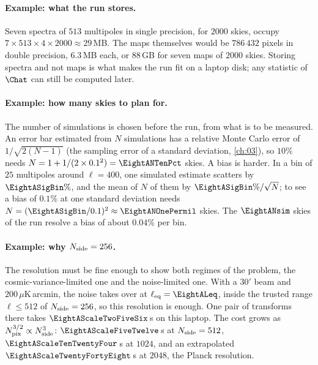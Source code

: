 \paragraph{Example: what the run stores.}
Seven spectra of $513$ multipoles in single precision, for $2000$ skies, occupy
$7\times513\times4\times2000\approx29$\,MB. The maps themselves would be $786\,432$ pixels in
double precision, $6.3$\,MB each, or $88$\,GB for seven maps of $2000$ skies. Storing spectra and
not maps is what makes the run fit on a laptop disk; any statistic of $\Chat$ can still be
computed later.

\paragraph{Example: how many skies to plan for.}
The number of simulations is chosen before the run, from what is to be measured. An error bar
estimated from $N$ simulations has a relative Monte Carlo error of $1/\sqrt{2(N-1)}$ (the
sampling error of a standard deviation, \cref{ch:03}), so $10\%$ needs
$N=1+1/(2\times0.1^2)=\EightANTenPct$ skies. A bias is harder. In a bin of $25$ multipoles
around $\ell=400$, one simulated estimate scatters by $\EightASigBin\%$, and the mean of $N$ of
them by $\EightASigBin\%/\sqrt N$; to see a bias of $0.1\%$ at one standard deviation needs
$N=(\EightASigBin/0.1)^2\approx\EightANOnePermil$ skies. The $\EightANsim$ skies of the run
resolve a bias of about $0.04\%$ per bin.

\paragraph{Example: why $N_{\rm side}=256$.}
The resolution must be fine enough to show both regimes of the problem, the
cosmic-variance-limited one and the noise-limited one. With a $30'$ beam and
$200\,\mu$K\,arcmin, the noise takes over at $\ell_{\rm eq}=\EightALeq$, inside the trusted
range $\ell\le512$ of $N_{\rm side}=256$, so this resolution is enough. One pair of
transforms there takes $\EightAScaleTwoFiveSix$\,s on this laptop. The cost grows as
$N_{\rm pix}^{3/2}\propto N_{\rm side}^3$: $\EightAScaleFiveTwelve$\,s at $N_{\rm side}=512$,
$\EightAScaleTenTwentyFour$\,s at $1024$, and an extrapolated $\EightAScaleTwentyFortyEight$\,s at
$2048$, the Planck resolution.

